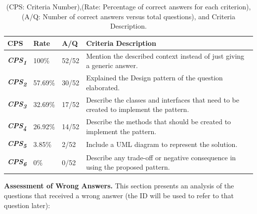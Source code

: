 \begin{table}[!ht] 
    \small
    \centering
    \caption{(CPS: Criteria Number),(Rate: Percentage of correct answers for each criterion), (A/Q: Number of correct answers versus total questions), and Criteria Description.}
    \label{table:cps}
    \begin{tabular}{p{0.4in}p{0.5in}p{0.5in}p{4.0in}}       
        \toprule
         \hline
        \rowcolor{gray!19} \textbf{CPS}  & \textbf{Rate} & \textbf{A/Q} & \textbf{Criteria Description}  ~\\ \hline
        \textbf{\textit{CPS\textsubscript{1}}} & 100\% & 52/52 & Mention the described context instead of just giving a generic answer. ~\\ \hline
        \rowcolor{gray!19} \textbf{\textit{CPS\textsubscript{2}}} & 57.69\% & 30/52 & Explained the Design pattern of the question elaborated.  ~\\ \hline
       \textbf{\textit{CPS\textsubscript{3}}} & 32.69\% & 17/52  & Describe the classes and interfaces that need to be created to implement the pattern. ~\\ \hline
       \rowcolor{gray!19} \textbf{\textit{CPS\textsubscript{4}}} & 26.92\% & 14/52  & Describe the methods that should be created to implement the pattern. ~\\ \hline
       \textbf{\textit{CPS\textsubscript{5}}} & 3.85\% & 2/52  & Include a UML diagram to represent
        the solution. ~\\ \hline
       \rowcolor{gray!19} \textbf{\textit{CPS\textsubscript{6}}} & 0\% & 0/52  & Describe any trade-off or negative consequence in using the proposed pattern. ~\\ \hline
       \bottomrule
    \end{tabular}
    \objectsource{\objectsourceauthor}
\end{table}


\textbf{Assessment of Wrong Answers.} This section presents an analysis of the questions that received a wrong answer (the ID will be used to refer to that question later):

